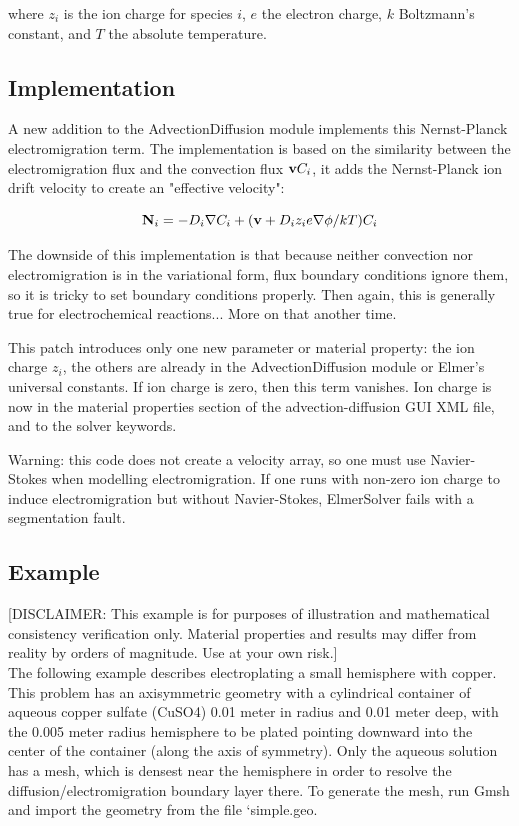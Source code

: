 where $z_i$ is the ion charge for species $i$, $e$ the electron charge, $k$ Boltzmann's constant, and $T$ the absolute temperature. 

\subsection{Implementation}

A new addition to the AdvectionDiffusion module implements this Nernst-Planck electromigration term. The implementation is based on the similarity between the electromigration flux and the convection flux $\bold v C_i$, it adds the Nernst-Planck ion drift velocity to create an "effective velocity":

\begin{equation}
\bold N_i = -D_i \nabla C_i + (\bold v + D_i z_i e \nabla \phi/kT) C_i
\end{equation}

The downside of this implementation is that because neither convection nor electromigration is in the variational form, flux boundary conditions ignore them, so it is tricky to set boundary conditions properly. Then again, this is generally true for electrochemical reactions... More on that another time.

This patch introduces only one new parameter or material property: the ion charge $z_i$, the others are already in the AdvectionDiffusion module or Elmer's universal constants. If ion charge is zero, then this term vanishes. Ion charge is now in the material properties section of the advection-diffusion GUI XML file, and to the solver keywords.

Warning: this code does not create a velocity array, so one must use Navier-Stokes when modelling electromigration.  If one runs with non-zero ion charge to induce electromigration but without Navier-Stokes, ElmerSolver fails with a segmentation fault. 

\subsection{Example}

[DISCLAIMER: This example is for purposes of illustration and mathematical consistency verification only. Material properties and results may differ from reality by orders of magnitude. Use at your own risk.] \\

The following example describes electroplating a small hemisphere with copper. This problem has an axisymmetric geometry with a cylindrical container of aqueous copper sulfate (CuSO4) 0.01 meter in radius and 0.01 meter deep, with the 0.005 meter radius hemisphere to be plated pointing downward into the center of the container (along the axis of symmetry). Only the aqueous solution has a mesh, which is densest near the hemisphere in order to resolve the diffusion/electromigration boundary layer there. To generate the mesh, run Gmsh and import the geometry from the file `simple.geo. 

